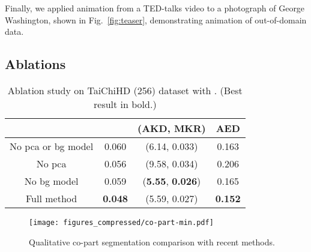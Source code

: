 \documentclass[final]{cvpr}
\begin{document}
\begin{table}[t]
\centering
    \caption{User study: second column - the proportion (\%) of users that prefer our method over FOMM~\cite{fomm}; third column - the proportion (\%) of users that prefer animation via disentanglement over \emph{standard} animation for our model.}
    \label{tab:user}
    \vspace{-0.6cm}
\end{table}

Finally, we applied animation from a TED-talks video to a photograph of George Washington, shown in Fig.~\ref{fig:teaser}, demonstrating animation of out-of-domain data. 

\subsection{Ablations}

\begin{table}[t]
\centering
    \begin{tabular}{c|ccc}
        \toprule
        &  & ({AKD}, {MKR}) & {AED} \\  \midrule
No pca or bg model & 0.060 & (6.14, 0.033) & 0.163 \\
        No pca & 0.056 & (9.58, 0.034) & 0.206 \\
        No bg model & 0.059 & ({\bf 5.55}, {\bf 0.026}) & 0.165 \\
        Full method & \bf 0.048 & (5.59, 0.027) & \bf 0.152\\
        \bottomrule
    \end{tabular}
    \caption{Ablation study on TaiChiHD (256) dataset with . (Best result in bold.)}
    \label{tab:ablation}
    \vspace{-0.2cm}
\end{table}

\begin{figure}[t]
    \centering
    \texttt{[image: figures\_compressed/co-part-min.pdf]}
    \caption{Qualitative co-part segmentation comparison with recent methods.}
    \label{fig:copart}
    \vspace{-0.4cm}
\end{figure}
\end{document}
